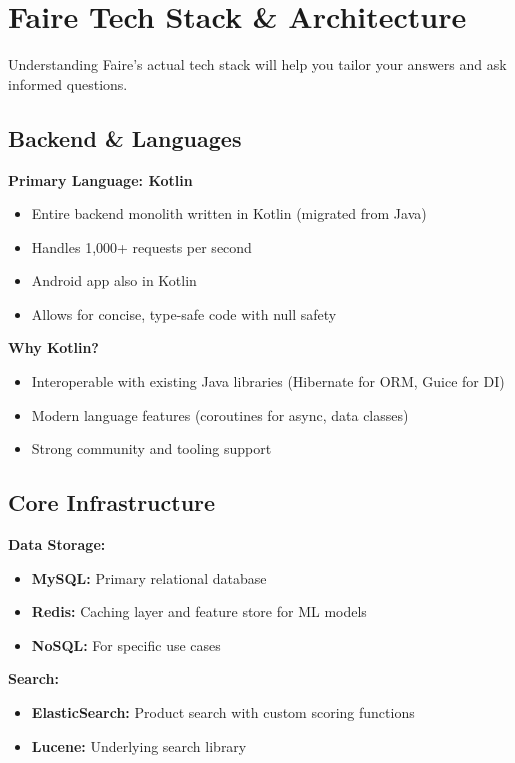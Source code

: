\documentclass[11pt,letterpaper]{article}
\begin{document}
\section{Faire Tech Stack \& Architecture}

Understanding Faire's actual tech stack will help you tailor your answers and ask informed questions.

\subsection{Backend \& Languages}

\textbf{Primary Language: Kotlin}
\begin{itemize}
    \item Entire backend monolith written in Kotlin (migrated from Java)
    \item Handles 1,000+ requests per second
    \item Android app also in Kotlin
    \item Allows for concise, type-safe code with null safety
\end{itemize}

\textbf{Why Kotlin?}
\begin{itemize}
    \item Interoperable with existing Java libraries (Hibernate for ORM, Guice for DI)
    \item Modern language features (coroutines for async, data classes)
    \item Strong community and tooling support
\end{itemize}

\subsection{Core Infrastructure}

\textbf{Data Storage:}
\begin{itemize}
    \item \textbf{MySQL:} Primary relational database
    \item \textbf{Redis:} Caching layer and feature store for ML models
    \item \textbf{NoSQL:} For specific use cases
\end{itemize}

\textbf{Search:}
\begin{itemize}
    \item \textbf{ElasticSearch:} Product search with custom scoring functions
    \item \textbf{Lucene:} Underlying search library
\end{itemize}
\end{document}
